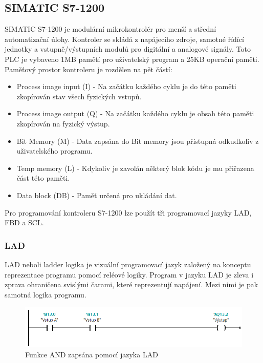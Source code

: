 \documentclass[a4paper,12pt,czech,bibliography=totoc]{scrbook}
\begin{document}
\subsection{SIMATIC S7-1200}
SIMATIC S7-1200 je modulární mikrokontrolér pro menší a střední automatizační úlohy. Kontroler se skládá z napájecího zdroje, samotné řídící jednotky a vstupně/výstupních modulů pro digitální a analogové signály. Toto PLC je vybaveno 1MB pamětí pro uživatelský program a 25KB operační paměti.
\newline
Paměťový prostor kontroleru je rozdělen na pět částí:
\begin{itemize}
	\item Process image input (I) - Na začátku každého cyklu je do této paměti zkopírován stav všech fyzických vstupů.\\
	\item Process image output (Q) - Na začátku každého cyklu je obsah této paměti zkopírován na fyzický výstup.\\
	\item Bit Memory (M) - Data zapsána do Bit memory jsou přístupná odkudkoliv z uživatelského programu. \\
	\item Temp memory (L) - Kdykoliv je zavolán některý blok kódu je mu přiřazena část této paměti.\\
	\item Data block (DB) - Paměť určená pro ukládání dat. \\
\end{itemize}
Pro programování kontroleru S7-1200 lze použít tři programovací jazyky LAD, FBD a SCL.
\subsubsection*{LAD}
	LAD neboli ladder logika je vizuální programovací jazyk založený na konceptu reprezentace programu pomocí reléové logiky.  Program v jazyku LAD je zleva i zprava ohraničena svislými čarami, které reprezentují napájení. Mezi nimi je pak samotná logika programu.
	\begin{figure}[h]
		\centering
		\includegraphics[scale = 0.6]{LAD_AND.PNG}
		\caption{Funkce AND zapsána pomocí jazyka LAD}
		\label{fig:my_label}
	\end{figure}
\end{document}
